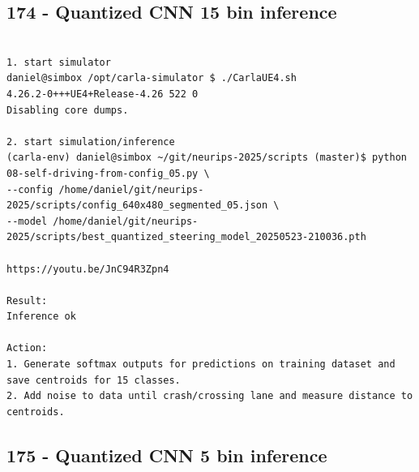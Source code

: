 \subsection{174 - Quantized CNN 15 bin inference}
\label{app_res:174}

\begin{verbatim}

1. start simulator
daniel@simbox /opt/carla-simulator $ ./CarlaUE4.sh 
4.26.2-0+++UE4+Release-4.26 522 0
Disabling core dumps.

2. start simulation/inference
(carla-env) daniel@simbox ~/git/neurips-2025/scripts (master)$ python 08-self-driving-from-config_05.py \
--config /home/daniel/git/neurips-2025/scripts/config_640x480_segmented_05.json \
--model /home/daniel/git/neurips-2025/scripts/best_quantized_steering_model_20250523-210036.pth

https://youtu.be/JnC94R3Zpn4

Result:
Inference ok

Action:
1. Generate softmax outputs for predictions on training dataset and save centroids for 15 classes.
2. Add noise to data until crash/crossing lane and measure distance to centroids.

\end{verbatim}

\subsection{175 - Quantized CNN 5 bin inference}
\label{app_res:175}

